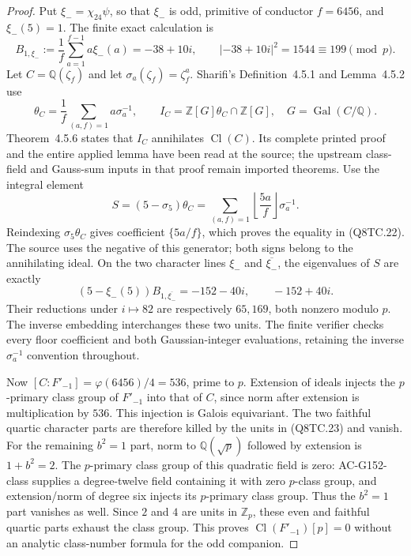 \begin{proof}
Put $\xi_- =\chi_{24}\psi$, so that $\xi_-$ is odd,
primitive of conductor $f=6456$, and $\xi_-(5)=1$.
The finite exact calculation is
\[
 B_{1,\xi_-}:=\frac1f\sum_{a=1}^{f-1}a\xi_-(a)
           =-38+10i,\qquad |-38+10i|^2=1544\equiv199\pmod p.
 \tag{Q8TC.20}
\]
Let $C=\mathbb Q(\zeta_f)$ and let
$\sigma_a(\zeta_f)=\zeta_f^a$.
Sharifi's Definition~4.5.1 and Lemma~4.5.2 use
\[
 \theta_C=\frac1f\sum_{(a,f)=1}a\sigma_a^{-1},\qquad
 I_C=\mathbb Z[G]\theta_C\cap\mathbb Z[G],\quad
                         G=\operatorname{Gal}(C/\mathbb Q).
 \tag{Q8TC.21}
\]
Theorem~4.5.6 states that $I_C$ annihilates $\operatorname{Cl}(C)$.
Its complete printed proof and the entire applied lemma have been
read at the source; the upstream class-field and Gauss-sum inputs
in that proof remain imported theorems.
Use the integral element
\[
 S=(5-\sigma_5)\theta_C
    =\sum_{(a,f)=1}\left\lfloor\frac{5a}{f}\right\rfloor
                                                   \sigma_a^{-1}.
 \tag{Q8TC.22}
\]
Reindexing $\sigma_5\theta_C$ gives coefficient
$\{5a/f\}$, which proves the equality in (Q8TC.22).
The source uses the negative of this generator; both signs
belong to the annihilating ideal.
On the two character lines $\xi_-$ and $\overline{\xi_-}$,
the eigenvalues of $S$ are exactly
\[
 (5-\xi_-(5))B_{1,\overline{\xi_-}}
             =-152-40i,\qquad -152+40i.
 \tag{Q8TC.23}
\]
Their reductions under $i\mapsto82$ are respectively $65,169$,
both nonzero modulo $p$.  The inverse embedding interchanges
these two units.
The finite verifier checks every floor coefficient and both
Gaussian-integer evaluations, retaining the inverse
$\sigma_a^{-1}$ convention throughout.

Now $[C:F'_{-1}]=\varphi(6456)/4=536$, prime to $p$.
Extension of ideals injects the $p$-primary class group of
$F'_{-1}$ into that of $C$, since norm after extension is
multiplication by $536$.
This injection is Galois equivariant.
The two faithful quartic character parts are therefore killed
by the units in (Q8TC.23) and vanish.
For the remaining $b^2=1$ part, norm to $\mathbb Q(\sqrt p)$
followed by extension is $1+b^2=2$.
The $p$-primary class group of this quadratic field is zero:
AC-G152-class supplies a degree-twelve field containing it with
zero $p$-class group, and extension/norm of degree six injects
its $p$-primary class group.
Thus the $b^2=1$ part vanishes as well.
Since $2$ and $4$ are units in $\mathbb Z_p$, these even and
faithful quartic parts exhaust the class group.
This proves $\operatorname{Cl}(F'_{-1})[p]=0$ without an
analytic class-number formula for the odd companion.


\end{proof}
